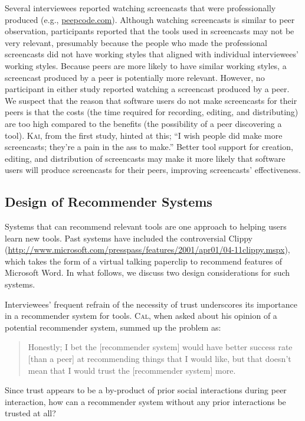 \documentclass[smallextended]{svjour3}
\newcommand\discovery{peer interaction\xspace}
\newcommand\discpull{peer observation\xspace}
\newcommand{\subject}[1]{\textsc{#1}}
\newcommand{\ksub}{{\subject{Cal}}\xspace}
\newcommand{\lsub}{{\subject{Kai}}\xspace}
\begin{document}
Several interviewees reported watching screencasts that were professionally
produced (e.g., \url{peepcode.com}).
Although watching screencasts is similar to \discpull, participants reported
that the tools used in screencasts may not be very relevant, presumably because
the people who made the professional screencasts did not have working
styles that aligned with individual interviewees' working styles.
Because peers are more likely to have similar working styles, a
screencast produced by a peer is potentially more relevant.
However, no participant in either study reported watching a screencast produced by a peer.
We suspect that the reason that software users do not make screencasts for their
peers is that the costs (the time required for recording, editing, and distributing) are
too high compared to the benefits (the possibility of a peer discovering a
tool).
\lsub, from the first study, hinted at this; ``I wish people did make more screencasts; they're a
pain in the ass to make.''
Better tool support for creation, editing, and distribution of screencasts may
make it more likely that software users will produce screencasts for their peers,
improving screencasts' effectiveness.

\subsection{Design of Recommender Systems}

\noindent
Systems that can recommend relevant tools are one approach to helping users
learn new tools.
Past systems have included the controversial Clippy 
(\url{http://www.microsoft.com/presspass/features/2001/apr01/04-11clippy.mspx}),
which takes the form of a virtual talking paperclip to recommend features of
Microsoft Word.
In what follows, we discuss two design considerations for such systems.

 Interviewees' frequent refrain of the necessity of trust
underscores its importance in a recommender system for tools. 
\ksub, when asked about his opinion of a potential recommender system, summed up
the problem as:


\begin{quote}
Honestly; I bet the [recommender system] would have better success rate [than
a peer] at recommending things that I would like, but that doesn't mean that I
would trust the [recommender system] more.
\end{quote}

Since trust appears to be a by-product of prior social interactions during \discovery,
how can a recommender system without any prior interactions be trusted
at all?
\end{document}
